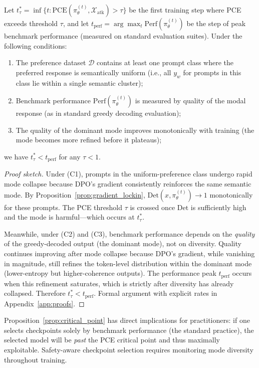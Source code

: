 \begin{proposition}
\label{prop:critical_point}
Let $t^*_\tau = \inf\{t : \text{PCE}(\pi_\theta^{(t)}, \mathcal{X}_{\text{atk}}) > \tau\}$ be the first training step where PCE exceeds threshold $\tau$, and let $t_{\text{perf}} = \arg\max_t \text{Perf}(\pi_\theta^{(t)})$ be the step of peak benchmark performance (measured on standard evaluation suites). Under the following conditions:
\begin{enumerate}[leftmargin=*,itemsep=0pt]
    \item[(C1)] The preference dataset $\mathcal{D}$ contains at least one prompt class where the preferred response is semantically uniform (i.e., all $y_w$ for prompts in this class lie within a single semantic cluster);
    \item[(C2)] Benchmark performance $\text{Perf}(\pi_\theta^{(t)})$ is measured by quality of the modal response (as in standard greedy decoding evaluation);
    \item[(C3)] The quality of the dominant mode improves monotonically with training (the mode becomes more refined before it plateaus);
\end{enumerate}
we have $t^*_\tau < t_{\text{perf}}$ for any $\tau < 1$.
\end{proposition}
\begin{proof}[Proof sketch]
Under (C1), prompts in the uniform-preference class undergo rapid mode collapse because DPO's gradient consistently reinforces the same semantic mode. By Proposition~\ref{prop:gradient_lockin}, $\text{Det}(x, \pi_\theta^{(t)}) \to 1$ monotonically for these prompts. The PCE threshold $\tau$ is crossed once $\text{Det}$ is sufficiently high and the mode is harmful---which occurs at $t^*_\tau$.

Meanwhile, under (C2) and (C3), benchmark performance depends on the \emph{quality} of the greedy-decoded output (the dominant mode), not on diversity. Quality continues improving after mode collapse because DPO's gradient, while vanishing in magnitude, still refines the token-level distribution within the dominant mode (lower-entropy but higher-coherence outputs). The performance peak $t_{\text{perf}}$ occurs when this refinement saturates, which is strictly after diversity has already collapsed. Therefore $t^*_\tau < t_{\text{perf}}$. Formal argument with explicit rates in Appendix~\ref{app:proofs}.
\end{proof}

\begin{remark}
Proposition~\ref{prop:critical_point} has direct implications for practitioners: if one selects checkpoints solely by benchmark performance (the standard practice), the selected model will be \emph{past} the PCE critical point and thus maximally exploitable. Safety-aware checkpoint selection requires monitoring mode diversity throughout training.
\end{remark}

